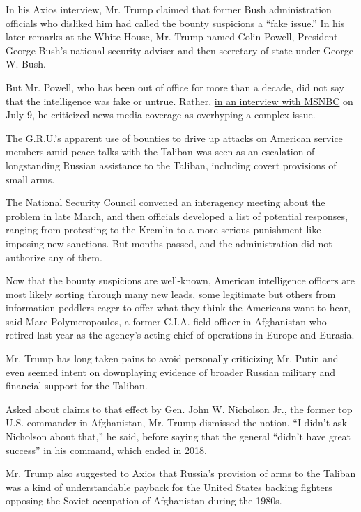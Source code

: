 In his Axios interview, Mr. Trump claimed that former Bush
administration officials who disliked him had called the bounty
suspicions a ``fake issue.'' In his later remarks at the White House,
Mr. Trump named Colin Powell, President George Bush's national security
adviser and then secretary of state under George W. Bush.

But Mr. Powell, who has been out of office for more than a decade, did
not say that the intelligence was fake or untrue. Rather,
\href{https://www.mediaite.com/tv/retired-general-colin-powell-accuses-media-of-almost-hysterical-coverage-of-russia-taliban-bounty-program-it-got-kind-of-out-of-control/}{in
an interview with MSNBC} on July 9, he criticized news media coverage as
overhyping a complex issue.

The G.R.U.'s apparent use of bounties to drive up attacks on American
service members amid peace talks with the Taliban was seen as an
escalation of longstanding Russian assistance to the Taliban, including
covert provisions of small arms.

The National Security Council convened an interagency meeting about the
problem in late March, and then officials developed a list of potential
responses, ranging from protesting to the Kremlin to a more serious
punishment like imposing new sanctions. But months passed, and the
administration did not authorize any of them.

Now that the bounty suspicions are well-known, American intelligence
officers are most likely sorting through many new leads, some legitimate
but others from information peddlers eager to offer what they think the
Americans want to hear, said Marc Polymeropoulos, a former C.I.A. field
officer in Afghanistan who retired last year as the agency's acting
chief of operations in Europe and Eurasia.

Mr. Trump has long taken pains to avoid personally criticizing Mr. Putin
and even seemed intent on downplaying evidence of broader Russian
military and financial support for the Taliban.

Asked about claims to that effect by Gen. John W. Nicholson Jr., the
former top U.S. commander in Afghanistan, Mr. Trump dismissed the
notion. ``I didn't ask Nicholson about that,'' he said, before saying
that the general ``didn't have great success'' in his command, which
ended in 2018.

Mr. Trump also suggested to Axios that Russia's provision of arms to the
Taliban was a kind of understandable payback for the United States
backing fighters opposing the Soviet occupation of Afghanistan during
the 1980s.

